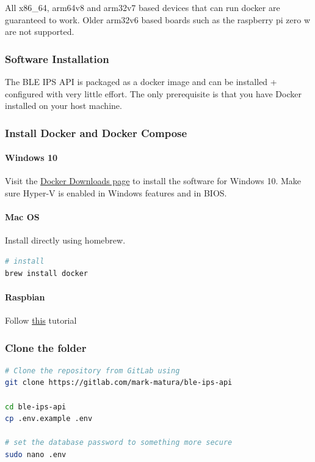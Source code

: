 \documentclass[a4paper, oneside]{ipsreport}
\begin{document}
All x86\_64, arm64v8 and arm32v7 based devices that can run docker are guaranteed to work. Older arm32v6 based boards such as the raspberry pi zero w are not supported.

\subsubsection*{Software Installation}
The BLE IPS API is packaged as a docker image and can be installed + configured with very little effort. The only prerequisite is that you have Docker installed on your host machine.

\subsubsection*{Install Docker and Docker Compose}

\paragraph*{Windows 10}
Visit the \href{https://www.docker.com/products/docker-desktop}{Docker Downloads page} to install the software for Windows 10. Make sure Hyper-V is enabled in Windows features and in BIOS.
\paragraph*{Mac OS}
Install directly using homebrew.
\begin{lstlisting}[language=bash]
# install
brew install docker
\end{lstlisting}
\paragraph*{Raspbian}
Follow \href{https://dev.to/rohansawant/installing-docker-and-docker-compose-on-the-raspberry-pi-in-5-simple-steps-3mgl}{this} tutorial

\subsubsection*{Clone the folder}
\begin{lstlisting}[language=bash]
# Clone the repository from GitLab using
git clone https://gitlab.com/mark-matura/ble-ips-api

cd ble-ips-api
cp .env.example .env

# set the database password to something more secure
sudo nano .env
\end{lstlisting}
\end{document}
